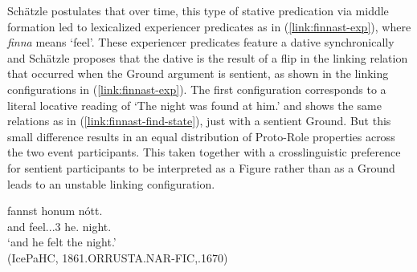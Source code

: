 \documentclass[output=paper,hidelinks]{langscibook}
\begin{document}
\hspace{1.1cm}
\vspace{1ex}

Sch\"{a}tzle postulates that over time, this type of stative predication via
middle formation led to
lexicalized experiencer predicates as in  (\ref{link:finnast-exp}), where
\textit{finna} means  `feel'.  These experiencer predicates
feature a dative \SUBJ synchronically and Sch\"{a}tzle proposes that the dative
\SUBJ is the result of a flip in the linking relation that occurred when the
Ground argument is sentient, as shown in the linking configurations in
(\ref{link:finnast-exp}).  The first configuration corresponds to a literal
locative reading of `The night was found at him.' and shows the same
relations as in (\ref{link:finnast-find-state}), just with a sentient
Ground.  But this small difference results in an equal distribution of
Proto-Role properties across the two event participants.  This taken together
with a crosslinguistic preference for sentient participants to be interpreted as
a Figure rather than as a Ground leads to an unstable linking configuration.  


\ea \label{link:finnast-exp}
 {fannst} {honum} {nótt.}\\
{and} {feel.{\PST.\MID.3\SG}}  {he.{\DAT}} {night.{\NOM}}\\
\glt `and he felt the night.' \\  (IcePaHC, 1861.ORRUSTA.NAR-FIC,.1670) 
\z
\end{document}
